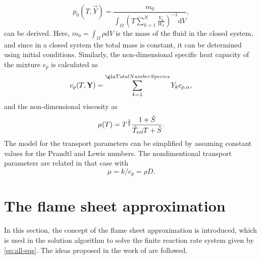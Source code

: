 \begin{equation}
	p_0(T, \vec{Y}) = \frac{m_0}{\int_\Omega \left( T\sum_{k=1}^{N} \frac{Y_k}{W_k} \right)^{-1}\text{d}V}, \label{eq:p0Condition}
\end{equation}
can be derived. Here, $m_0 = \int_\Omega \rho \text{d}V$ is the mass of the fluid in the closed system, and since in a closed system the total mass is constant, it can be determined using initial conditions.
Similarly, the non-dimensional specific heat capacity of the mixture $c_p$ is calculated as
\begin{equation}\label{eq:nondim_cpmixture}
	c_p(T,\mathbf{Y}) = \SumOvAllns Y_k c_{p,\alpha},
\end{equation}
and the non-dimensional viscosity as
\begin{equation} \label{eq:nondim_sutherland}
	\mu(T) =  T^{\frac{3}{2}}\frac{1+\hat{S} }{\hat T_{\text{ref}}T+\hat{S}}.
\end{equation}
The model for the transport parameters can be simplified by assuming constant values for the Prandtl and Lewis numbers. \parencite{smokeFormulationPremixedNonpremixed1991}  The nondimentional transport parameters are related in that case with 
\begin{equation}
    \mu = k/c_p = \rho D.
\end{equation}
\section{The flame sheet approximation} \label{sec:FlameSheet}
In this section, the concept of the flame sheet approximation is introduced, which is used in the solution algorithm to solve the finite reaction rate system given by \cref{eq:all-eqs}. The ideas proposed in the work of \textcite{keyesFlameSheetStarting1987} are followed.

